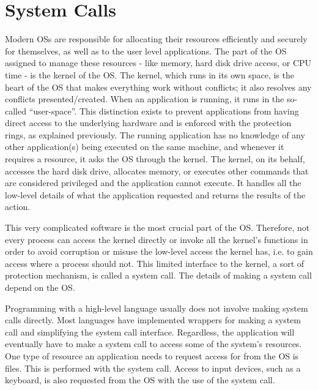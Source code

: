 \section{System Calls}\label{sec:syscalls}
Modern \ac{OS}s are responsible for allocating their resources efficiently and securely for themselves, as well as to the user level applications. The part of the \ac{OS} assigned to manage these resources - like memory, hard disk drive access, or \ac{CPU} time - is the kernel of the \ac{OS}. The kernel, which runs in its own space, is the heart of the \ac{OS} that makes everything work without conflicts; it also resolves any conflicts presented/created. When an application is running, it runs in the so-called ``user-space''. This distinction exists to prevent applications from having direct access to the underlying hardware and is enforced with the protection rings, as explained previously. The running application has no knowledge of any other application(s) being executed on the same machine, and whenever it requires a resource, it asks the \ac{OS} through the kernel. The kernel, on its behalf, accesses the hard disk drive, allocates memory, or executes other commands that are considered privileged and the application cannot execute. It handles all the low-level details of what the application requested and returns the results of the action. 

\par This very complicated software is the most crucial part of the \ac{OS}. Therefore, not every process can access the kernel directly or invoke all the kernel's functions in order to avoid corruption or misuse the low-level access the kernel has, i.e. to gain access where a process should not. This limited interface to the kernel, a sort of protection mechanism, is called a system call. The details of making a system call depend on the \ac{OS}.

\par Programming with a high-level language usually does not involve making system calls directly. Most languages have implemented wrappers for making a system call and simplifying the system call interface. Regardless, the application will eventually have to make a system call to access some of the system's resources. One type of resource an application needs to request access for from the \ac{OS} is files. This is performed with the  system call. Access to input devices, such as a keyboard, is also requested from the \ac{OS} with the use of the  system call.

